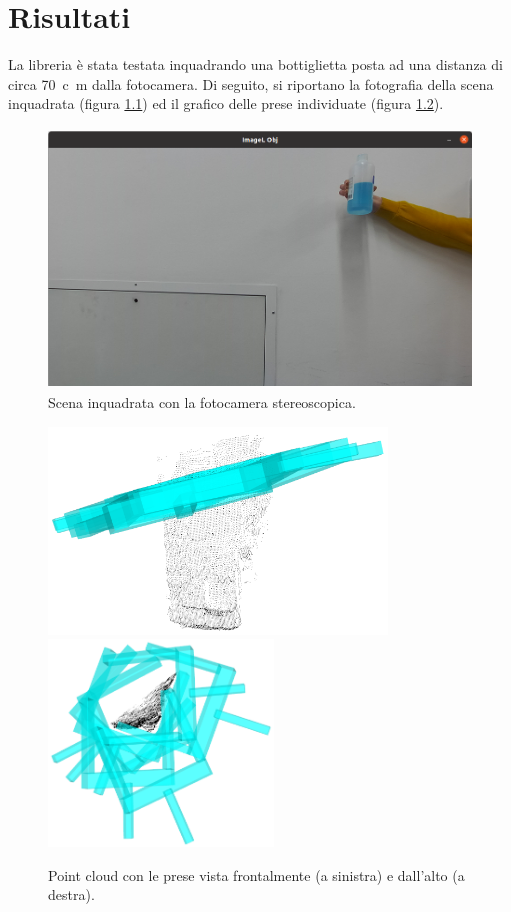 \documentclass{report}
\begin{document}
\newpage
\chapter{Risultati}\label{risultati}
La libreria è stata testata inquadrando una bottiglietta posta ad una distanza di circa \SI{70}{c\meter} dalla fotocamera. Di seguito, si riportano la fotografia della scena inquadrata (figura \ref{figura:scenalab}) ed il grafico delle prese individuate (figura \ref{figura:preselab}). 
\begin{figure}[h!]
	\centering
	\includegraphics[height=6.9cm]{immagini/lab3}
	\caption{Scena inquadrata con la fotocamera stereoscopica.}
	\label{figura:scenalab}
\end{figure}
\begin{figure}[h!]
	\centering
	\includegraphics[height=5.5cm]{immagini/lab1}
	\includegraphics[height=5.5cm]{immagini/lab2}
	\caption{Point cloud con le prese vista frontalmente (a sinistra) e dall'alto (a destra).}
	\label{figura:preselab}
\end{figure}
\end{document}
